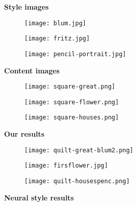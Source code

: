 \documentclass[a4paper]{article}
\begin{document}
\begin{figure}[!h]
\centering
\textbf{Style images}\par\medskip
\begin{subfigure}{.32\textwidth}
  \centering
  \texttt{[image: blum.jpg]}
  \caption{\label{fig:blum}}
\end{subfigure}
\begin{subfigure}{.32\textwidth}
  \centering
  \texttt{[image: fritz.jpg]}
  \caption{\label{fig:fritz}}
\end{subfigure}
\begin{subfigure}{.32\textwidth}
  \centering
  \texttt{[image: pencil-portrait.jpg]}
  \caption{\label{fig:pencil-portrait}}
\end{subfigure}
\textbf{Content images}\par\medskip
\begin{subfigure}{.32\textwidth}
  \centering
  \texttt{[image: square-great.png]}
  \caption{\label{fig:square-great}}
\end{subfigure}
\begin{subfigure}{.32\textwidth}
  \centering
  \texttt{[image: square-flower.png]}
  \caption{\label{fig:square-flower}}
\end{subfigure}
\begin{subfigure}{.32\textwidth}
  \centering
  \texttt{[image: square-houses.png]}
  \caption{\label{fig:square-houses}}
\end{subfigure}
\textbf{Our results}\par\medskip
\begin{subfigure}{.34\textwidth}
  \centering
  \texttt{[image: quilt-great-blum2.png]}
  \caption{\label{fig:quilt-great-blum}}
\end{subfigure}
\begin{subfigure}{.32\textwidth}
  \centering
  \texttt{[image: firsflower.jpg]}
  \caption{\label{fig:firsflower}}
\end{subfigure}
\begin{subfigure}{.32\textwidth}
  \centering
  \texttt{[image: quilt-housespenc.png]}
  \caption{\label{fig:quilt-housespenc}}
\end{subfigure}
\textbf{Neural style results}\par\medskip
\begin{subfigure}{.34\textwidth}
  \centering

\end{subfigure}
\end{figure}
\end{document}
